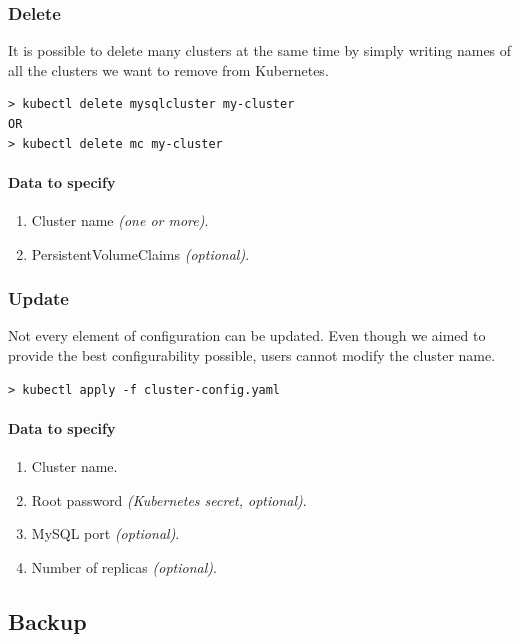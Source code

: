 \subsubsection*{Delete}

It is possible to delete many clusters at the same time by simply writing
names of all the clusters we want to remove from Kubernetes.

\begin{lstlisting}
> kubectl delete mysqlcluster my-cluster
OR
> kubectl delete mc my-cluster
\end{lstlisting}

\paragraph{Data to specify}
\begin{enumerate}
	\item Cluster name \textit{(one or more)}.
	\item PersistentVolumeClaims \textit{(optional)}.
\end{enumerate}

\subsubsection*{Update}

Not every element of configuration can be updated. Even though we aimed
to provide the best configurability possible, users cannot modify the
cluster name.

\begin{lstlisting}
> kubectl apply -f cluster-config.yaml
\end{lstlisting}

\paragraph{Data to specify}
\begin{enumerate}
	\item Cluster name.
	\item Root password \textit{(Kubernetes secret, optional)}.
	\item MySQL port \textit{(optional)}.
	\item Number of replicas \textit{(optional)}.
\end{enumerate}

\subsection{Backup}
